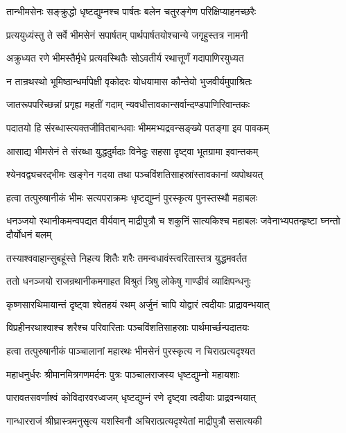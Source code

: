 \twolineshloka
{तान्भीमसेनः सङ्क्रुद्धो धृष्टद्युम्नश्च पार्षतः}
{बलेन चतुरङ्गेण परिक्षिप्याहनच्छरैः}


\twolineshloka
{प्रत्ययुध्यंस्तु ते सर्वे भीमसेनं सपार्षतम्}
{पार्थपार्षतयोश्चान्ये जगृहुस्तत्र नामनी}


\twolineshloka
{अक्रुध्यत रणे भीमस्तैर्मृधे प्रत्यवस्थितैः}
{सोऽवतीर्य रथात्तूर्णं गदापाणिरयुध्यत}


\twolineshloka
{न तान्रथस्थो भूमिष्ठान्धर्मापेक्षी वृकोदरः}
{योधयामास कौन्तेयो भुजवीर्यमुपाश्रितः}


\twolineshloka
{जातरूपपरिच्छन्नां प्रगृह्य महतीं गदाम्}
{न्यवधीत्तावकान्सर्वान्दण्डपाणिरिवान्तकः}


\twolineshloka
{पदातयो हि संरब्धास्त्यक्तजीवितबान्धवाः}
{भीममभ्यद्रवन्सङ्ख्ये पतङ्गा इव पावकम्}


\twolineshloka
{आसाद्य भीमसेनं ते संरब्धा युद्धदुर्मदाः}
{विनेदुः सहसा दृष्ट्वा भूतग्रामा इवान्तकम्}


\twolineshloka
{श्येनवद्व्यचरद्भीमः खङ्गेन गदया तथा}
{पञ्चविंशतिसाहस्रांस्तावकानां व्यपोथयत्}


\twolineshloka
{हत्वा तत्पुरुषानीकं भीमः सत्यपराक्रमः}
{धृष्टद्युम्नं पुरस्कृत्य पुनस्तस्थौ महाबलः}


धनञ्जयो रथानीकमन्वपद्यत वीर्यवान्
\twolineshloka
{माद्रीपुत्रौ च शकुनिं सात्यकिश्च महाबलः}
{जवेनाभ्यपतन्हृष्टा घ्नन्तो दौर्योधनं बलम्}


\twolineshloka
{तस्याश्ववाहान्सुबहूंस्ते निहत्य शितैः शरैः}
{तमन्वधावंस्त्वरितास्तत्र युद्धमवर्तत}


\twolineshloka
{ततो धनञ्जयो राजन्रथानीकमगाहत}
{विश्रुतं त्रिषु लोकेषु गाण्डीवं व्याक्षिपन्धनुः}


\twolineshloka
{कृष्णसारथिमायान्तं दृष्ट्वा श्वेतहयं रथम्}
{अर्जुनं चापि योद्वारं त्वदीयाः प्राद्रावन्भयात्}


\twolineshloka
{विप्रहीनरथाश्वाश्च शरैश्च परिवारिताः}
{पञ्चविंशतिसाहस्राः पार्थमार्च्छन्पदातयः}


\twolineshloka
{हत्वा तत्पुरुषानीकं पाञ्चालानां महारथः}
{भीमसेनं पुरस्कृत्य न चिरात्प्रत्यदृश्यत}


\twolineshloka
{महाधनुर्धरः श्रीमानमित्रगणमर्दनः}
{पुत्रः पाञ्चालराजस्य धृष्टद्युम्नो महायशाः}


\twolineshloka
{पारावतसवर्णाश्वं कोविदारवरध्वजम्}
{धृष्टद्युम्नं रणे दृष्ट्वा त्वदीयाः प्राद्रवन्भयात्}


\twolineshloka
{गान्धारराजं श्रीघ्रास्त्रमनुसृत्य यशस्विनौ}
{अचिरात्प्रत्यदृश्येतां माद्रीपुत्रौ ससात्यकी}


